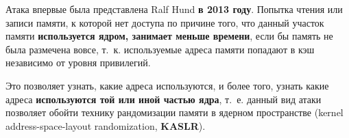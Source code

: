\begin{frame}{\insertsubsection}
{    Атака впервые была представлена Ralf Hund \textbf{в 2013 году}. Попытка
    чтения или записи памяти, к которой нет доступа по причине того, что данный
    участок памяти \textbf{используется ядром, занимает меньше времени}, если бы
    память не была размечена вовсе, т. к. используемые адреса памяти попадают в
    кэш независимо от уровня привилегий.

    Это позволяет узнать, какие адреса используются, и более того, узнать какие
    адреса \textbf{используются той или иной частью ядра}, т. е. данный вид
    атаки позволяет обойти технику рандомизации памяти в ядерном пространстве
    (kernel address-space-layout randomization, \textbf{KASLR}).

  }
\end{frame}
